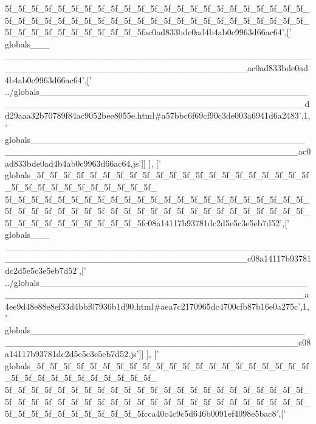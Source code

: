 \begin{DoxyCode}
{      5f\_5f\_5f\_5f\_5f\_5f\_5f\_5f\_5f\_5f\_5f\_5f\_5f\_5f\_5f\_5f\_5f\_5f\_5f\_5f\_5f\_5f\_5f\_5f\_5f\_5f\_5f\_5f\_5f\_5f\_5f\_5f\_5f\_5f\_5f\_5f\_5f\_5f\_5f\_5f\_5f\_5f\_5f\_5f\_5f\_5f\_5f\_5f\_5f\_5f\_5f\_5f\_5f\_5f\_5f\_5f\_5fac0ad833bde0ad4b4ab0c9963d66ac64'},[\textcolor{stringliteral}{'
      globals\_\_\_
      \_\_\_\_\_\_\_\_\_\_\_\_\_\_\_\_\_\_\_\_\_\_\_\_\_\_\_\_\_\_\_\_\_\_\_\_\_\_\_\_\_\_\_\_\_\_\_\_\_\_\_\_\_\_\_\_\_\_\_\_\_\_\_\_\_\_\_\_\_\_\_\_\_\_\_\_\_\_\_\_\_\_\_\_\_\_ac0ad833bde0ad4b4ab0c9963d66ac64'},[\textcolor{stringliteral}{'
      ../globals\_\_\_\_\_\_\_\_\_\_\_\_\_\_\_\_\_\_\_\_\_\_\_\_\_\_\_\_\_\_\_\_\_\_\_\_\_\_\_\_\_\_\_\_\_\_\_\_\_\_\_\_\_\_\_\_\_\_\_\_\_\_\_\_\_\_\_\_\_\_\_\_\_\_\_\_\_\_\_\_\_\_\_\_\_\_\_\_\_dd29aaa32b70789f84ac9052bee8055e.html#a57bbc6f69cf90c3de003a6941d6a2483'},1,\textcolor{stringliteral}{'
      globals\_\_\_\_\_\_\_\_\_\_\_\_\_\_\_\_\_\_\_\_\_\_\_\_\_\_\_\_\_\_\_\_\_\_\_\_\_\_\_\_\_\_\_\_\_\_\_\_\_\_\_\_\_\_\_\_\_\_\_\_\_\_\_\_\_\_\_\_\_\_\_\_\_\_\_\_\_\_\_\_\_\_\_\_\_\_\_\_\_ac0ad833bde0ad4b4ab0c9963d66ac64.js'}]]
      ],
  [\textcolor{stringliteral}{'
      globals\_5f\_5f\_5f\_5f\_5f\_5f\_5f\_5f\_5f\_5f\_5f\_5f\_5f\_5f\_5f\_5f\_5f\_5f\_5f\_5f\_5f\_5f\_5f\_5f\_5f\_5f\_5f\_5f\_5f\_5f\_5f\_5f\_
      5f\_5f\_5f\_5f\_5f\_5f\_5f\_5f\_5f\_5f\_5f\_5f\_5f\_5f\_5f\_5f\_5f\_5f\_5f\_5f\_5f\_5f\_5f\_5f\_5f\_5f\_5f\_5f\_5f\_5f\_5f\_5f\_5f\_5f\_5f\_5f\_5f\_5f\_5f\_5f\_5f\_5f\_5f\_5f\_5f\_5f\_5f\_5f\_5f\_5f\_5f\_5f\_5f\_5f\_5f\_5f\_5fc08a14117b93781dc2d5e5c3e5eb7d52'},[\textcolor{stringliteral}{'
      globals\_\_\_
      \_\_\_\_\_\_\_\_\_\_\_\_\_\_\_\_\_\_\_\_\_\_\_\_\_\_\_\_\_\_\_\_\_\_\_\_\_\_\_\_\_\_\_\_\_\_\_\_\_\_\_\_\_\_\_\_\_\_\_\_\_\_\_\_\_\_\_\_\_\_\_\_\_\_\_\_\_\_\_\_\_\_\_\_\_\_c08a14117b93781dc2d5e5c3e5eb7d52'},[\textcolor{stringliteral}{'
      ../globals\_\_\_\_\_\_\_\_\_\_\_\_\_\_\_\_\_\_\_\_\_\_\_\_\_\_\_\_\_\_\_\_\_\_\_\_\_\_\_\_\_\_\_\_\_\_\_\_\_\_\_\_\_\_\_\_\_\_\_\_\_\_\_\_\_\_\_\_\_\_\_\_\_\_\_\_\_\_\_\_\_\_\_\_\_\_\_\_\_a4ee9d48e88e8ef33d4bbf07936b1d90.html#aea7c2170965dc4700cfb87b16e0a275c'},1,\textcolor{stringliteral}{'
      globals\_\_\_\_\_\_\_\_\_\_\_\_\_\_\_\_\_\_\_\_\_\_\_\_\_\_\_\_\_\_\_\_\_\_\_\_\_\_\_\_\_\_\_\_\_\_\_\_\_\_\_\_\_\_\_\_\_\_\_\_\_\_\_\_\_\_\_\_\_\_\_\_\_\_\_\_\_\_\_\_\_\_\_\_\_\_\_\_\_c08a14117b93781dc2d5e5c3e5eb7d52.js'}]]
      ],
  [\textcolor{stringliteral}{'
      globals\_5f\_5f\_5f\_5f\_5f\_5f\_5f\_5f\_5f\_5f\_5f\_5f\_5f\_5f\_5f\_5f\_5f\_5f\_5f\_5f\_5f\_5f\_5f\_5f\_5f\_5f\_5f\_5f\_5f\_5f\_5f\_5f\_
      5f\_5f\_5f\_5f\_5f\_5f\_5f\_5f\_5f\_5f\_5f\_5f\_5f\_5f\_5f\_5f\_5f\_5f\_5f\_5f\_5f\_5f\_5f\_5f\_5f\_5f\_5f\_5f\_5f\_5f\_5f\_5f\_5f\_5f\_5f\_5f\_5f\_5f\_5f\_5f\_5f\_5f\_5f\_5f\_5f\_5f\_5f\_5f\_5f\_5f\_5f\_5f\_5f\_5f\_5f\_5f\_5fcca40c4c9c5d646b0091ef4098e5bac8'},[\textcolor{stringliteral}{'
}
\end{DoxyCode}
